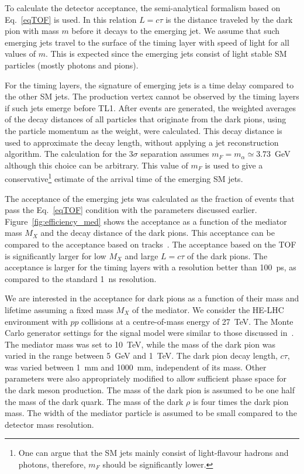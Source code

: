 To calculate the detector acceptance, the semi-analytical formalism based on Eq.~\ref{eqTOF} is used. In this relation $L=c\tau$ is the distance traveled
by the dark pion with mass $m$ before it decays to the emerging jet.  
We assume that such emerging jets travel to the surface of the timing layer with speed of light for all values of $m$.
This is expected since the emerging jets consist of light stable SM particles (mostly photons and pions).
  
For the timing layers, the signature of emerging jets is a time delay compared to the other SM jets. The  production vertex
cannot be observed by the timing layers if such jets emerge before TL1.
After events are generated, the weighted averages of the decay distances of all particles that originate from
the dark pions, using the particle momentum as the weight, were  calculated. This decay distance is used
to approximate the decay length, without applying a jet reconstruction algorithm.  
The  calculation for the $3\sigma$ separation assumes $m_F=m_{\alpha}\simeq 3.73$~GeV although this choice can be arbitrary.
This value of $m_F$ is used to give a conservative\footnote{One can argue that the SM jets mainly consist of light-flavour hadrons and photons, 
therefore, $m_F$ should be significantly lower.} estimate of the arrival time of the emerging SM jets.

The acceptance of the emerging jets was calculated as the fraction of  events that pass the 
Eq.~\ref{eqTOF} condition  with the parameters discussed earlier. 
 Figure~\ref{fig:efficiency_med} shows the acceptance as a function of the mediator mass $M_X$ and the decay distance
of the dark pions. This acceptance can be compared to the acceptance based on tracks~\cite{Sirunyan:2018njd}. 
The acceptance based on the TOF is significantly larger for low $M_X$ and large $L=c\tau$ of the dark pions.  
The acceptance is larger for the timing layers with a resolution better than 100~ps, as compared to the standard 1~ns resolution. 

We are interested in the acceptance  for dark pions  as a function of their mass
and lifetime assuming a fixed mass $M_X$ of the mediator. We  consider the HE-LHC environment 
with $pp$ collisions at a centre-of-mass energy of 27~TeV.    
The Monte Carlo generator settings for the signal model were similar
to those discussed in~\cite{Sirunyan:2018njd,prive}.
The mediator mass was set to 10~TeV, while the mass of the dark pion was varied in the range between 5~GeV and 1~TeV.
The dark pion decay length, $c\tau$,  was varied between 1~mm and 1000~mm, independent of its mass. Other parameters
were also appropriately modified to allow  sufficient phase space for the dark meson production.
The mass of the dark pion is assumed to be one half the mass of the dark quark. The mass of the dark
$\rho$ is four times the dark pion mass. The width of the
mediator particle is assumed to be small compared to the detector mass resolution.

